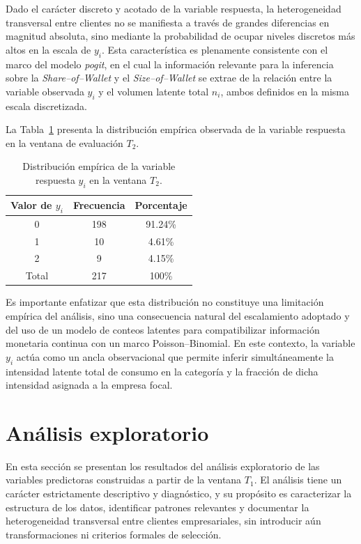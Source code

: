    Dado el carácter discreto y acotado de la variable respuesta, la heterogeneidad transversal entre clientes no se manifiesta a través de grandes diferencias en magnitud absoluta, sino mediante la probabilidad de ocupar niveles discretos más altos en la escala de \(y_i\). Esta característica es plenamente consistente con el marco del modelo \emph{pogit}, en el cual la información relevante para la inferencia sobre la \emph{Share--of--Wallet} y el \emph{Size--of--Wallet} se extrae de la relación entre la variable observada \(y_i\) y el volumen latente total \(n_i\), ambos definidos en la misma escala discretizada.
    
    La Tabla~\ref{tab:resumen_y} presenta la distribución empírica observada de la variable respuesta en la ventana de evaluación \(T_2\).
    
    \begin{table}[H]
    \centering
    \caption{Distribución empírica de la variable respuesta \(y_i\) en la ventana \(T_2\).}
    \label{tab:resumen_y}
    \begin{tabular}{ccc}
    \hline
    Valor de \(y_i\) & Frecuencia & Porcentaje \\
    \hline
    0 & 198 & 91.24\% \\
    1 & 10  & 4.61\% \\
    2 & 9   & 4.15\% \\
    \hline
    Total & 217 & 100\% \\
    \hline
    \end{tabular}
    \end{table}
    
    Es importante enfatizar que esta distribución no constituye una limitación empírica del análisis, sino una consecuencia natural del escalamiento adoptado y del uso de un modelo de conteos latentes para compatibilizar información monetaria continua con un marco Poisson--Binomial. En este contexto, la variable \(y_i\) actúa como un ancla observacional que permite inferir simultáneamente la intensidad latente total de consumo en la categoría y la fracción de dicha intensidad asignada a la empresa focal.
    
\section{Análisis exploratorio}
    En esta sección se presentan los resultados del análisis exploratorio de las variables predictoras construidas a partir de la ventana \(T_1\). El análisis tiene un carácter estrictamente descriptivo y diagnóstico, y su propósito es caracterizar la estructura de los datos, identificar patrones relevantes y documentar la heterogeneidad transversal entre clientes empresariales, sin introducir aún transformaciones ni criterios formales de selección.
    
